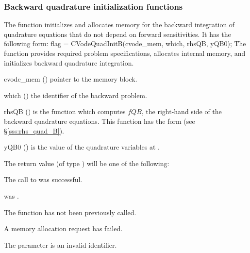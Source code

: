 \subsubsection{Backward quadrature initialization functions}
\label{sss:cvquadinitb}

The function  initializes and allocates memory for the backward
integration of quadrature equations that do not depend on forward sensitivities.
It has the following form:
{
flag = CVodeQuadInitB(cvode\_mem, which, rhsQB, yQB0);
}
{
  The function  provides required problem specifications,
  allocates internal memory, and initializes backward quadrature integration.
}
{
  \begin{args}
  \item[cvode\_mem] ()
    pointer to the {\cvodes} memory block.
  \item[which] ()
    the identifier of the backward problem.
  \item[rhsQB] ()
    is the {\C} function which computes $fQB$, the right-hand side of the 
    backward quadrature equations. This function has the form 
    (see \S\ref{sss:rhs_quad_B}).
  \item[yQB0] ()
    is the value of the quadrature variables at .
  \end{args}
}
{
  The return value  (of type ) will be one of the following:
  \begin{args}
  \item[\Id{CV\_SUCCESS}]
    The call to  was successful.
  \item[\Id{CV\_MEM\_NULL}] 
     was .
  \item[\Id{CV\_NO\_ADJ}]
    The function  has not been previously called.
  \item[\Id{CV\_MEM\_FAIL}] 
    A memory allocation request has failed.
  \item[\Id{CV\_ILL\_INPUT}]
    The parameter  is an invalid identifier.
  \end{args}
}
{}


